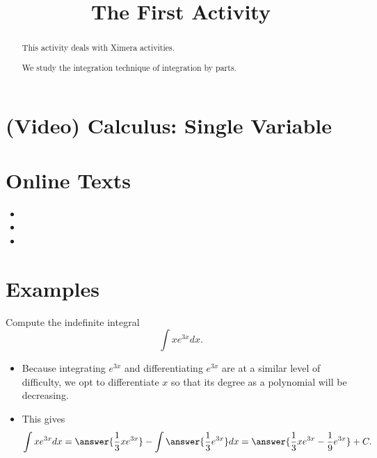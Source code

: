 \documentclass{ximera}
\title{The First Activity}
\begin{document}
  
\begin{abstract}  
This activity deals with Ximera activities.  
\end{abstract}  
\maketitle
\begin{abstract}
We study the integration technique of integration by parts.
\end{abstract}
\maketitle

\section*{(Video) Calculus: Single Variable}


\section*{Online Texts}
\begin{itemize}
\item {}
\item {}
\item {}
\end{itemize}

\section*{Examples}


\begin{example}
Compute the indefinite integral
\[ \int x e^{3x} dx. \]
\begin{itemize}
\item Because integrating $e^{3x}$ and differentiating $e^{3x}$ are at a similar level of difficulty, we opt to differentiate $x$ so that its degree as a polynomial will be decreasing.
\item This gives
\[ \int x e^{3x} dx = \answer{\frac{1}{3} x e^{3x}} - \int \answer{ \frac{1}{3} e^{3x} } dx = \answer{ \frac{1}{3} x e^{3x} - \frac{1}{9} e^{3x} } + C. \]
\end{itemize}
\end{example}
\end{document}
